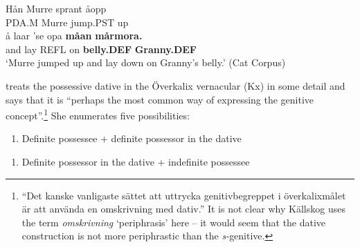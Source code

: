 \ea\label{}
\gll Hån  Murre  sprant  åopp\\
PDA.M  Murre  jump.PST  up\\
\gll å  laar  ’se  opa  \textbf{måan} \textbf{mårmora.}\\
and  lay  REFL  on  \textbf{belly.DEF} \textbf{Granny.DEF}\\
\glt ‘Murre jumped up and lay down on Granny’s belly.’ (Cat Corpus)
\z

\citet[161--163]{Källskog1992} treats the possessive dative in the Överkalix vernacular (Kx) in some detail and says that it is “perhaps the most common way of expressing the genitive concept”.\footnote{ “Det kanske vanligaste sättet att uttrycka genitivbegreppet i överkalixmålet är att använda en omskrivning med dativ.” It is not clear why Källskog uses the term \textit{omskrivning} ‘periphrasis’ here – it would seem that the dative construction is not more periphrastic than the \textit{s-}genitive.} She enumerates five possibilities:

\begin{enumerate}
\item[1] Definite possessee + definite possessor in the dative
\end{enumerate}


\ea\label{}

\z 
\z 

\begin{enumerate}
\item[2] Definite possessor in the dative + indefinite possessee
\end{enumerate} 

\ea\label{}

